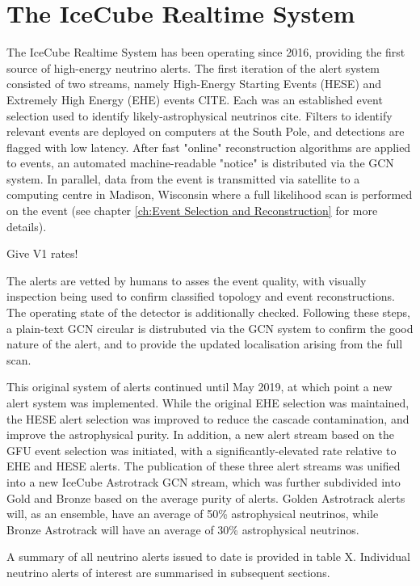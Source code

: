\section{The IceCube Realtime System}
The IceCube Realtime System has been operating since 2016, providing the first source of high-energy neutrino alerts. The first iteration of the alert system consisted of two streams, namely High-Energy Starting Events (HESE) and Extremely High Energy (EHE) events CITE. Each was an established event selection used to identify likely-astrophysical neutrinos cite. Filters to identify relevant events are deployed on computers at the South Pole, and detections are flagged  with low latency. After fast "online" reconstruction algorithms are applied to events, an automated machine-readable "notice" is distributed via the GCN system. In parallel, data from the event is transmitted via satellite to a computing centre in Madison, Wisconsin where a full likelihood scan is performed on the event (see chapter \ref{ch:Event Selection and Reconstruction} for more details). 

Give V1 rates!

The alerts are vetted by humans to asses the event quality, with visually inspection being used to confirm classified topology and event reconstructions. The operating state of the detector is additionally checked. Following these steps, a plain-text GCN circular is distrubuted via the GCN system to confirm the good nature of the alert, and to provide the updated localisation arising from the full scan. 

This original system of alerts continued until May 2019, at which point a new alert system was implemented. While the original EHE selection was maintained, the HESE alert selection was improved to reduce the cascade contamination, and improve the astrophysical purity. In addition, a new alert stream based on the GFU event selection was initiated, with a significantly-elevated rate relative to EHE and HESE alerts. The publication of these three alert streams was unified into a new IceCube Astrotrack GCN stream, which was further subdivided into Gold and Bronze based on the average purity of alerts. Golden Astrotrack alerts will, as an ensemble, have an average of 50\% astrophysical neutrinos, while Bronze Astrotrack will have an average of 30\% astrophysical neutrinos.

A summary of all neutrino alerts issued to date is provided in table X. Individual neutrino alerts of interest are summarised in subsequent sections. 

